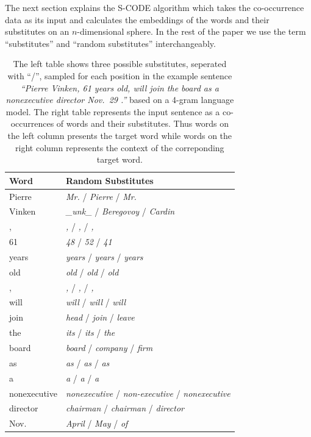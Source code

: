 The next section explains the S-CODE algorithm which takes the
co-occurrence data as its input and calculates the embeddings of the
words and their substitutes on an $n$-dimensional sphere.  In the rest
of the paper we use the term ``substitutes'' and ``random
substitutes'' interchangeably.

\begin{table}[ht]
\caption{The left table shows three possible substitutes, seperated
  with ``/'', sampled for each position in the example sentence
  \textit{``Pierre Vinken, 61 years old, will join the board as a
    nonexecutive director Nov.~29 .''} based on a 4-gram language
  model.  The right table represents the input sentence as a
  co-occurrences of words and their substitutes.  Thus words on the
  left column presents the target word while words on the right column
  represents the context of the correponding target word.}
\begin{tabular}{|ll|} \hline
\textbf{Word} & \textbf{Random Substitutes}\\
\hline
Pierre & \textit{Mr.}  / \textit{Pierre} /  \textit{Mr.}\\
Vinken & \textit{\_unk\_} / \textit{Beregovoy} / \textit{Cardin}\\
, & \textit{,} / \textit{,} / \textit{,}\\
61 & \textit{48} / \textit{52} / \textit{41}\\
years & \textit{years} /  \textit{years} /  \textit{years}\\
old & \textit{old} /  \textit{old} /  \textit{old}\\
, & \textit{,} /  \textit{,} /  \textit{,}\\
will & \textit{will} /  \textit{will} /  \textit{will}\\
join & \textit{head} /  \textit{join} /  \textit{leave}\\
the  & \textit{its} /  \textit{its} /  \textit{the}\\
board & \textit{board} /  \textit{company} / \textit{firm}\\
as & \textit{as} / \textit{as} / \textit{as}\\
a & \textit{a} / \textit{a} / \textit{a}\\
nonexecutive & \textit{nonexecutive} / \textit{non-executive} / \textit{nonexecutive}\\
director & \textit{chairman} / \textit{chairman} / \textit{director}\\
Nov. & \textit{April} / \textit{May} / \textit{of}\\

\end{tabular}
\end{table}
